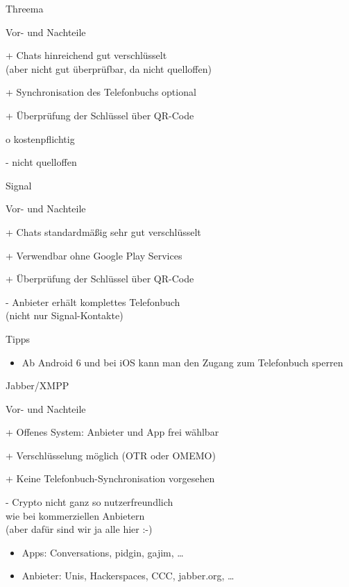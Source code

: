 \begin{frame}{Threema}
  \begin{blex}{Vor- und Nachteile}
    \item[+] Chats hinreichend gut verschlüsselt\\(aber nicht gut überprüfbar, da nicht quelloffen)
    \item[+] Synchronisation des Telefonbuchs optional
    \item[+] Überprüfung der Schlüssel über QR-Code
    \item[o] kostenpflichtig
    \item[-] nicht quelloffen
  \end{blex}
\end{frame}

\begin{frame}{Signal}
  \begin{blex}{Vor- und Nachteile}
    \item[+] Chats standardmäßig sehr gut verschlüsselt
    \item[+] Verwendbar ohne Google Play Services %
    \item[+] Überprüfung der Schlüssel über QR-Code
    \item[-] Anbieter erhält komplettes Telefonbuch\\ (nicht nur Signal-Kontakte)
  \end{blex}
  \begin{block}{Tipps}
    \begin{itemize}
      \item Ab Android 6 und bei iOS kann man den Zugang zum Telefonbuch sperren
    \end{itemize}
  \end{block}
\end{frame}

\begin{frame}{Jabber/XMPP}
  \begin{blex}{Vor- und Nachteile}
    \item[+] Offenes System: Anbieter und App frei wählbar
    \item[+] Verschlüsselung möglich (OTR oder OMEMO)
    \item[+] Keine Telefonbuch-Synchronisation vorgesehen
    \item[-] Crypto nicht ganz so nutzerfreundlich\\wie bei kommerziellen Anbietern\\(aber dafür sind wir ja alle hier :-)
  \end{blex}
  \begin{itemize}
    \item Apps: Conversations, pidgin, gajim, \ldots
    \item Anbieter: Unis, Hackerspaces, CCC, jabber.org, \ldots
  \end{itemize}
\end{frame}

